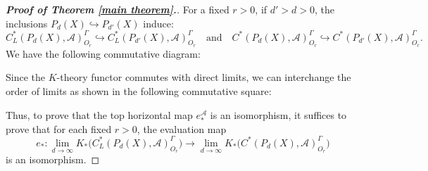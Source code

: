 \documentclass[pdflatex]{sn-jnl}
\theoremstyle{plain}
\theoremstyle{definition}
\def\A{\mathcal{A}}\def\C{\mathcal C}\def\B{\mathcal B}\def\E{\mathcal E}\def\O{\mathcal O}\def\G{\mathcal G}\def\h{\mathfrak h}\def\K{\mathcal K}\def\F{\mathcal F}\def\P{\mathcal P}\def\L{\mathcal{L}}\def\Q{\mathcal Q}\def\H{\mathcal H}\def\S{\mathcal S}\def\N{\mathcal N}\def\U{\mathcal U}\def\I{\mathcal I}\def\Z{\mathcal Z}\def\M{\mathcal M}
\begin{document}
\begin{proof}[\textbf{Proof of Theorem \ref{main theorem}.}]
For a fixed $r>0$, if $d'>d>0$, the inclusions $P_{d}(X)\hookrightarrow P_{d'}(X)$ induce:
\[C^{*}_{L}(P_{d}(X),\mathcal{A})^{\Gamma}_{O_{r}}\hookrightarrow C^{*}_{L}(P_{d'}(X),\mathcal{A})^{\Gamma}_{O_{r}}\quad \text{and}\quad C^{*}(P_{d}(X),\mathcal{A})^{\Gamma}_{O_{r}}\hookrightarrow C^{*}(P_{d'}(X),\mathcal{A})^{\Gamma}_{O_{r}}.\]
We have the following commutative diagram:
\begin{center}
\small
{}
\end{center}
Since the $K$-theory functor commutes with direct limits, we can interchange the order of limits as shown in the following commutative square:
\begin{center}
\end{center}
Thus, to prove that the top horizontal map $e_{*}^{\A}$ is an isomorphism, it suffices to prove that for each fixed $r>0$, the evaluation map
\begin{equation}\label{eq:fixed-r-isomorphism}
e_{*}:\lim_{d\to\infty}K_{*}\bigl(C^{*}_{L}(P_{d}(X),\mathcal{A})_{O_{r}}^{\Gamma}\bigr)\rightarrow\lim_{d\to\infty}K_{*}\bigl(C^{*}(P_{d}(X),\mathcal{A})_{O_{r}}^{\Gamma}\bigr)
\end{equation}
is an isomorphism.


\end{proof}
\end{document}
